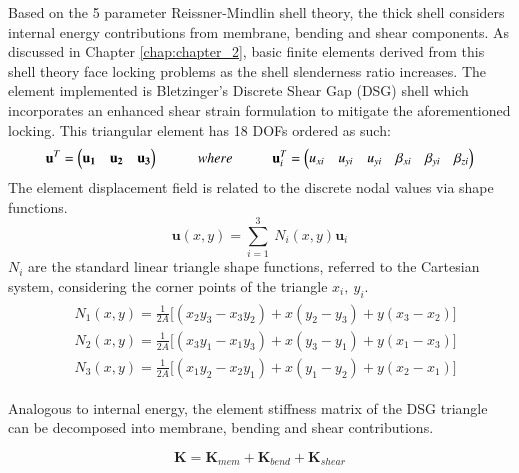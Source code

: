 Based on the 5 parameter Reissner-Mindlin shell theory, the thick shell considers internal energy contributions from membrane, bending and shear components. As discussed in Chapter \ref{chap:chapter_2}, basic finite elements derived from this shell theory face locking problems as the shell slenderness ratio increases. The element implemented is Bletzinger's Discrete Shear Gap (DSG) shell \cite{Ble00} which incorporates an enhanced shear strain formulation to mitigate the aforementioned locking. This triangular element has 18 DOFs ordered as such:
\begin{equation} 
\mathbf{u}^T = 
\begin{pmatrix}
\mathbf{u_1} & \mathbf{u_2} & \mathbf{u_3}
\end{pmatrix} 
\hspace{10mm}
where
\hspace{10mm}
\mathbf{u}_i^T = 
\begin{pmatrix}
{u_{xi}} & {u_{yi}} & {u_{yi}} & {\beta_{xi}} & {\beta_{yi}} & {\beta_{zi}}
\end{pmatrix}
\label{eqt1}
\end{equation}
The element displacement field is related to the discrete nodal values via shape functions.
\begin{equation} 
\mathbf{u}(x, y) = \sum_{i=1}^3 \ N_i(x,y) \mathbf{u}_i
\label{eqt2}
\end{equation}
$N_i$ are the standard linear triangle shape functions, referred to the Cartesian system, considering the corner points of the triangle $x_i,\ y_i$.
\begin{gather} 
	\begin{aligned}
		&N_1 (x , y) = \frac{1}{2 A} \big[ (x_2 y_3 - x_3 y_2) + x(y_2 - y_3) + y(x_3 - x_2) \big]
		\\
		&N_2 (x , y) = \frac{1}{2 A} \big[ (x_3 y_1 - x_1 y_3) + x(y_3 - y_1) + y(x_1 - x_3) \big]
		\\
		&N_3 (x , y) = \frac{1}{2 A} \big[ (x_1 y_2 - x_2 y_1) + x(y_1 - y_2) + y(x_2 - x_1) \big]
		\label{eqt3}
	\end{aligned}
\end{gather}

Analogous to internal energy, the element stiffness matrix of the DSG triangle can be decomposed into membrane, bending and shear contributions.

\begin{equation} 
\mathbf{K} = \mathbf{K}_{mem} + \mathbf{K}_{bend} + \mathbf{K}_{shear}
\label{eqt4}
\end{equation}

